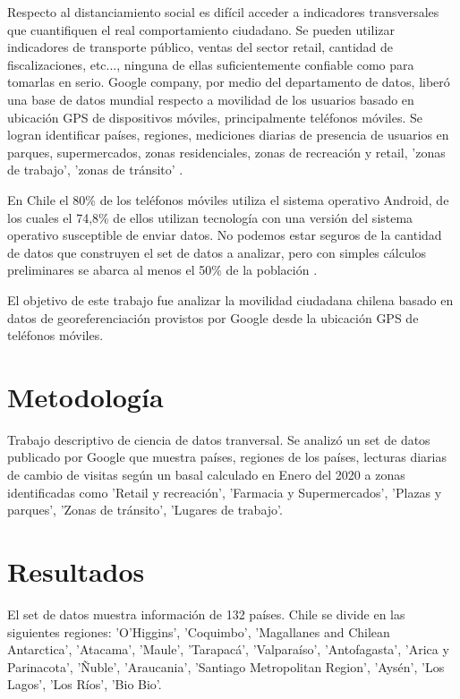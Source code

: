 \documentclass{article}
\begin{document}
Respecto al distanciamiento social es difícil acceder a indicadores transversales que cuantifiquen el real comportamiento ciudadano. Se pueden utilizar indicadores de transporte público, ventas del sector retail, cantidad de fiscalizaciones, etc..., ninguna de ellas suficientemente confiable como para tomarlas en serio. Google company, por medio del departamento de datos, liberó una base de datos mundial respecto a movilidad de los usuarios basado en ubicación GPS de dispositivos móviles, principalmente teléfonos móviles. Se logran identificar países, regiones, mediciones diarias de presencia de usuarios en parques, supermercados, zonas residenciales, zonas de recreación y retail, 'zonas de trabajo', 'zonas de tránsito' \cite{google_covid-19_2020,our_world_in_data_google_2020}.

En Chile el 80\% de los teléfonos móviles utiliza el sistema operativo Android, de los cuales el 74,8\% de ellos utilizan tecnología con una versión del sistema operativo susceptible de enviar datos. No podemos estar seguros de la cantidad de datos que construyen el set de datos a analizar, pero con simples cálculos preliminares se abarca al menos el 50\% de la población \cite{statcounter_mobile_nodate, android_developer_panel_nodate, casas_iphone_nodate}.

El objetivo de este trabajo fue analizar la movilidad ciudadana chilena basado en datos de georeferenciación provistos por Google desde la ubicación GPS de teléfonos móviles.


\section{Metodología}
Trabajo descriptivo de ciencia de datos tranversal. Se analizó un set de datos publicado por Google  \cite{google_covid-19_2020} que muestra países, regiones de los países, lecturas diarias de cambio de visitas según un basal calculado en Enero del 2020 a zonas identificadas como 'Retail y recreación', 'Farmacia y Supermercados', 'Plazas y parques',	'Zonas de tránsito', 'Lugares de trabajo'.


\section{Resultados}

El set de datos muestra información de 132 países. Chile se divide en las siguientes regiones: 'O'Higgins', 'Coquimbo', 'Magallanes and Chilean Antarctica', 'Atacama',
'Maule', 'Tarapacá', 'Valparaíso', 'Antofagasta', 'Arica y Parinacota',
'Ñuble', 'Araucania', 'Santiago Metropolitan Region', 'Aysén',
'Los Lagos', 'Los Ríos', 'Bio Bio'.



\end{document}
